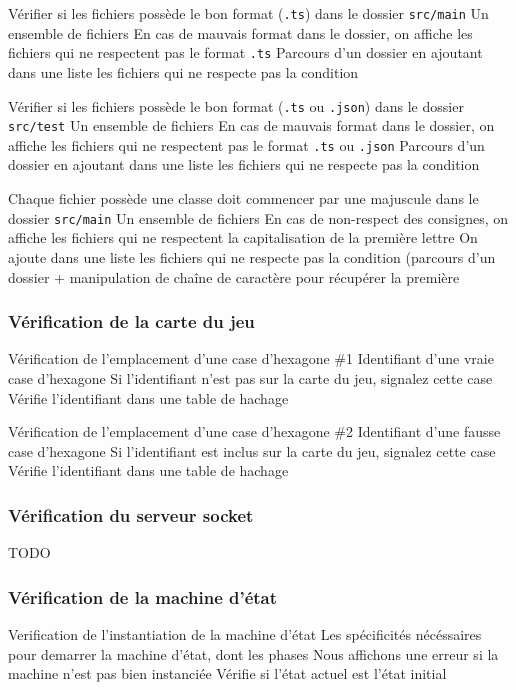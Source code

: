 \mytest
{Vérifier si les fichiers possède le bon format (\texttt{.ts}) dans le dossier \texttt{src/main}}
{Un ensemble de fichiers}
{En cas de mauvais format dans le dossier, on affiche les fichiers qui ne respectent pas le format \texttt{.ts}}
{Parcours d'un dossier en ajoutant dans une liste les fichiers qui ne respecte pas la condition}

\mytest
{Vérifier si les fichiers possède le bon format (\texttt{.ts} ou \texttt{.json}) dans le dossier \texttt{src/test}}
{Un ensemble de fichiers}
{En cas de mauvais format dans le dossier, on affiche les fichiers qui ne respectent pas le format \texttt{.ts} ou \texttt{.json}}
{Parcours d'un dossier en ajoutant dans une liste les fichiers qui ne respecte pas la condition}

\mytest
{Chaque fichier possède une classe doit commencer par une majuscule dans le dossier \texttt{src/main}}
{Un ensemble de fichiers}
{En cas de non-respect des consignes, on affiche les fichiers qui ne respectent la capitalisation de la première lettre}
{On ajoute dans une liste les fichiers qui ne respecte pas la condition (parcours d'un dossier + manipulation de chaîne de caractère pour récupérer la première}

\subsubsection{Vérification de la carte du jeu}

\mytest
{Vérification de l'emplacement d'une case d'hexagone \#1}
{Identifiant d'une vraie case d'hexagone}
{Si l'identifiant n'est pas sur la carte du jeu, signalez cette case}
{Vérifie l'identifiant dans une table de hachage}

\mytest
{Vérification de l'emplacement d'une case d'hexagone \#2}
{Identifiant d'une fausse case d'hexagone}
{Si l'identifiant est inclus sur la carte du jeu, signalez cette case}
{Vérifie l'identifiant dans une table de hachage}

\subsubsection{Vérification du serveur socket}

TODO

\subsubsection{Vérification de la machine d'état}
\mytest
{Verification de l'instantiation de la machine d'état}
{Les spécificités nécéssaires pour demarrer la machine d'état, dont les phases}
{Nous affichons une erreur si la machine n'est pas bien instanciée}
{Vérifie si l'état actuel est l'état initial}

